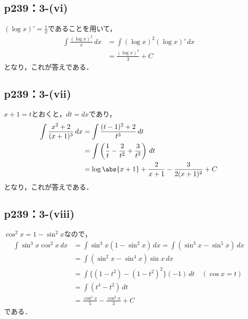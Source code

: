 \subsection*{p239：3-(vi)}

\begin{tanswer}
    $(\log x)' = \frac{1}{x}$であることを用いて，
    \begin{align*}
        \int \frac{(\log x)^2}{x} \, dx & = \int (\log x)^2 (\log x)' \, dx \\
                                        & = \frac{(\log x)^3}{3} + C
    \end{align*}
    となり，これが答えである．
\end{tanswer}

\subsection*{p239：3-(vii)}

\begin{tanswer}
    $x+1 =t$とおくと，$dt=dx$であり，
    \begin{align*}
        \int \frac{x^2+2}{(x+1)^3} \, dx & = \int \frac{(t-1)^2+2}{t^3} \, dt                                 \\
                                         & = \int \left (\frac{1}{t}-\frac{2}{t^2}+\frac{3}{t^3}\right) \, dt \\
                                         & = \log \abs{x+1}+\frac{2}{x+1}-\frac{3}{2(x+1)^2}+C
    \end{align*}
    となり，これが答えである．
\end{tanswer}

\subsection*{p239：3-(viii)}

\begin{tanswer}
    $\cos ^2 x = 1- \sin ^2 x$なので，
    \begin{align*}
        \int \sin ^3 x \cos ^2 x \, dx & = \int \sin ^3 x (1-\sin ^2 x) \, dx = \int (\sin ^3 x - \sin ^5 x ) \, dx \\
                                       & = \int (\sin ^2 x - \sin ^4 x) \sin x \, dx                                \\
                                       & = \int \{ (1-t^2)- (1-t^2)^2 \} (-1) \, dt \quad (\cos x =t)               \\
                                       & = \int (t^4 -t^2) \, dt                                                    \\
                                       & = \frac{\cos ^5 x}{5}-\frac{\cos ^3 x}{3}+C
    \end{align*}
    である．
\end{tanswer}

